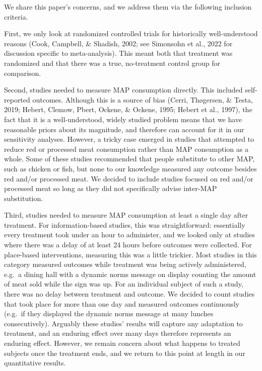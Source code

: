 \documentclass[
  man]{apa6}
\begin{document}
We share this paper's concerns, and we address them via the following inclusion criteria.

First, we only look at randomized controlled trials for historically well-understood reasons (Cook, Campbell, \& Shadish, 2002; see Simonsohn et al., 2022 for discussion specific to meta-analysis). This meant both that treatment was randomized and that there was a true, no-treatment control group for comparison.

Second, studies needed to measure MAP consumption directly. This included self-reported outcomes. Although this is a source of bias (Cerri, Thøgersen, \& Testa, 2019; Hebert, Clemow, Pbert, Ockene, \& Ockene, 1995; Hebert et al., 1997), the fact that it is a well-understood, widely studied problem means that we have reasonable priors about its magnitude, and therefore can account for it in our sensitivity analyses. However, a tricky case emerged in studies that attempted to reduce red or processed meat consumption rather than MAP consumption as a whole. Some of these studies recommended that people substitute to other MAP, such as chicken or fish, but none to our knowledge measured any outcome besides red and/or processed meat. We decided to include studies focused on red and/or processed meat so long as they did not specifically advise inter-MAP substitution.

Third, studies needed to measure MAP consumption at least a single day after treatment. For information-based studies, this was straightforward: essentially every treatment took under an hour to administer, and we looked only at studies where there was a delay of at least 24 hours before outcomes were collected. For place-based interventions, measuring this was a little trickier. Most studies in this category measured outcomes while treatment was being actively administered, e.g.~a dining hall with a dynamic norms message on display counting the amount of meat sold while the sign was up. For an individual subject of such a study, there was no delay between treatment and outcome. We decided to count studies that took place for more than one day and measured outcomes continuously (e.g.~if they displayed the dynamic norms message at many lunches consecutively). Arguably these studies' results will capture any adaptation to treatment, and an enduring effect over many days therefore represents an enduring effect. However, we remain concern about what happens to treated subjects once the treatment ends, and we return to this point at length in our quantitative results.
\end{document}
